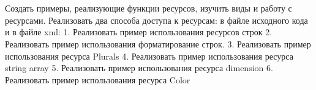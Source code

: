\section{}

\clearpage

Создать примеры, реализующие функции ресурсов, изучить виды и работу с
ресурсами. Реализовать два способа доступа к ресурсам: в файле исходного
кода и в файле xml:
1. Реализовать пример использования ресурсов строк
2. Реализовать пример использования форматирование строк.
3. Реализовать пример использования ресурса Plurals
4. Реализовать пример использования ресурса string array
5. Реализовать пример использования ресурса dimension
6. Реализовать пример использования ресурса Color
